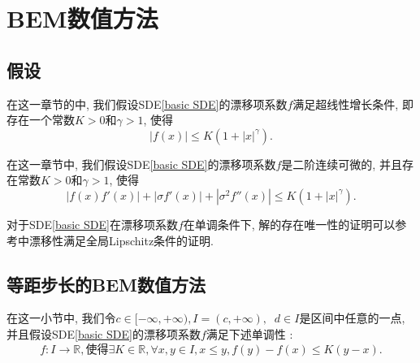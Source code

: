

\chapter{BEM数值方法}

\section{假设}


	



\begin{assumption}\label{super linear growth}
	在这一章节的中, 我们假设SDE\cref{basic SDE}的漂移项系数$f$满足超线性增长条件, 即存在一个常数$K>0$和$\gamma>1$, 使得
	\begin{equation}
		|f(x)| \le K(1+|x|^{\gamma}). 
	\end{equation}
\end{assumption}

\begin{assumption}\label{momentBEM}
	在这一章节中, 我们假设SDE\cref{basic SDE}的漂移项系数$f$是二阶连续可微的, 并且存在常数$K>0$和$\gamma>1$, 使得
	\begin{equation}
		|f(x)f'(x)| + |\sigma f'(x)| + |\sigma^2 f''(x)| \leq K(1 + |x|^{\gamma}).
	\end{equation}
	
\end{assumption}
对于SDE\cref{basic SDE}在漂移项系数$f$在单调条件下, 解的存在唯一性的证明可以参考\cite{umarov2018beyond}中漂移性满足全局Lipschitz条件的证明.

\section{等距步长的BEM数值方法}

\begin{assumption}\label{monotony}
在这一小节中, 我们令$c\in[-\infty,+\infty),I=(c,+\infty),\operatorname{}d\in I$是区间中任意的一点, 并且假设SDE\cref{basic SDE}的漂移项系数$f$满足下述单调性 :
\begin{equation}
	f:I\to\mathbb{R}  , 使得 \exists K \in\mathbb{R},\forall x,y\in I,x\leq y,f(y)-f(x)\leq K(y-x).
\end{equation}
\end{assumption}


